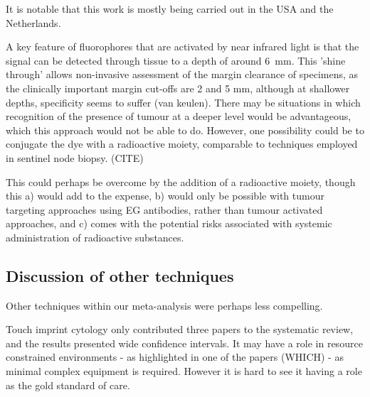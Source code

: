 It is notable that this work is mostly being carried out in the USA and the Netherlands.

A key feature of fluorophores that are activated by near infrared light is that the signal can be detected through tissue to a depth of around \SI{6}{\milli\meter}.
This 'shine through' allows non-invasive assessment of the margin clearance of specimens, as the clinically important margin cut-offs are 2 and 5 mm, although at shallower depths, specificity seems to suffer (van keulen).
There may be situations in which recognition of the presence of tumour at a deeper level would be advantageous, which this approach would not be able to do.
However, one possibility could be to conjugate the dye with a radioactive moiety, comparable to techniques employed in sentinel node biopsy. (CITE)

This could perhaps be overcome by the addition of a radioactive moiety, though this a) would add to the expense, b) would only be possible with tumour targeting approaches using EG antibodies, rather than tumour activated approaches, and c) comes with the potential risks associated with systemic administration of radioactive substances.

\subsection{Discussion of other techniques}

Other techniques within our meta-analysis were perhaps less compelling.

Touch imprint cytology only contributed three papers to the systematic review, and the results presented wide confidence intervals. 
It may have a role in resource constrained environments - as highlighted in one of the papers (WHICH) - as minimal complex equipment is required. 
However it is hard to see it having a role as the gold standard of care.



